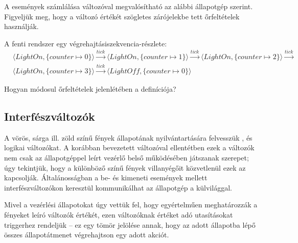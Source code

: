 \begin{megjegyzes}
A  események számlálása változóval megvalósítható az alábbi állapotgép szerint. Figyeljük meg, hogy a változó értékét szögletes zárójelekbe tett őrfeltételek használják.

\end{megjegyzes}

\begin{megjegyzes}
A fenti rendszer egy végrehajtásiszekvencia-részlete:
\begin{align*}
& \langle \mathit{LightOn}, \{ \mathit{counter} \mapsto 0 \} \rangle \xrightarrow{\mathit{tick}} 
  \langle \mathit{LightOn}, \{ \mathit{counter} \mapsto 1 \} \rangle \xrightarrow{\mathit{tick}}
  \langle \mathit{LightOn}, \{ \mathit{counter} \mapsto 2 \} \rangle \xrightarrow{\mathit{tick}} \\
& \langle \mathit{LightOn}, \{ \mathit{counter} \mapsto 3 \} \rangle \xrightarrow{\mathit{tick}} 
  \langle \mathit{LightOff}, \{ \mathit{counter} \mapsto 0 \} \rangle
\end{align*}

\end{megjegyzes}

\begin{feladat}
Hogyan módosul őrfeltételek jelenlétében a  definíciója?
\end{feladat}

\subsection{Interfészváltozók}

A vörös, sárga ill. zöld színű fények állapotának nyilvántartására felvesszük ,  és  logikai változókat. A korábban bevezetett  változóval ellentétben ezek a változók nem csak az állapotgéppel leírt vezérlő belső működésében játszanak szerepet; úgy tekintjük, hogy a különböző színű fények villanyégőit közvetlenül ezek az  kapcsolják. Általánosságban a be- és kimeneti események mellett interfészváltozókon keresztül kommunikálhat az állapotgép a külvilággal. 

Mivel a vezérlési állapotokat úgy vettük fel, hogy egyértelműen meghatározzák a fényeket leíró változók értékét, ezen változóknak értéket adó utasításokat  triggerhez rendeljük -- ez egy tömör jelölése annak, hogy az adott állapotba lépő összes állapotátmenet végrehajtson egy adott akciót.

